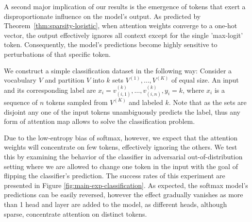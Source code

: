 \documentclass{article}
\theoremstyle{plain}
\theoremstyle{definition}
\theoremstyle{remark}
\begin{document}
A second major implication of our results is the emergence of tokens that exert a disproportionate influence on the model's output. As predicted by Theorem~\ref{thm:sparsity-logistic}, when attention weights converge to a one-hot vector, the output effectively ignores all context except for the single 'max-logit' token. Consequently, the model's predictions become highly sensitive to perturbations of that specific token. %





We construct a simple classification dataset in the following way:
Consider a vocabulary $V$ and partition $V$ into $k$ sets $V^{(1)},\ldots,V^{(K)}$ of equal size. An input and its corresponding label are  
$x_i = v^{(k)}_{(i,1)},\dots,v^{(k)}_{(i,n)}, y_{i}=k$, where $x_i$ is a sequence of $n$ tokens sampled from $V^{(K)}$ and labeled $k$. Note that as the sets are disjoint any one of the input tokens unambiguously predicts the label, thus any form of attention map allows to solve the classification problem.

Due to the low-entropy bias of softmax, however, we expect that the attention weights will concentrate on few tokens, effectively ignoring the others. We test this by examining the behavior of the classifier in adversarial out-of-distribution setting where we are allowed to change one token in the input with the goal of flipping the classifier's prediction. The success rates of this experiment are presented in Figure \ref{fig:main-exp-classification}. As expected, the softmax model's predictions can be easily reversed, however the effect gradually vanishes as more than 1 head and layer are added to the model, as different heads, although sparse, concentrate attention on distinct tokens.
\end{document}
